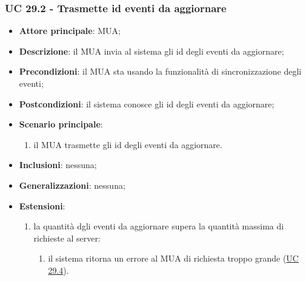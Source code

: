     \subsubsection{UC 29.2 - Trasmette id eventi da aggiornare} \label{sec:UC29.2}
    \begin{itemize}
        \item \textbf{Attore principale}: MUA;
        \item \textbf{Descrizione}: il MUA invia al sistema gli id degli eventi da aggiornare;
        \item \textbf{Precondizioni}: il MUA sta usando la funzionalità di sincronizzazione degli eventi;
        \item \textbf{Postcondizioni}: il sistema conosce gli id degli eventi da aggiornare;
        \item \textbf{Scenario principale}:
            \begin{enumerate}
                \item il MUA trasmette gli id degli eventi da aggiornare.
            \end{enumerate}
        \item \textbf{Inclusioni}: nessuna;
        \item \textbf{Generalizzazioni}: nessuna;
        \item \textbf{Estensioni}:
            \begin{enumerate}[label=\alph*.]
                \item la quantità dgli eventi da aggiornare supera la quantità massima di richieste al server:
                \begin{enumerate}[label=\arabic*.]
                    \item il sistema ritorna un errore al MUA di richiesta troppo grande (\hyperref[sec:UC29.4]{UC 29.4}).
                \end{enumerate}
            \end{enumerate}
    \end{itemize}


